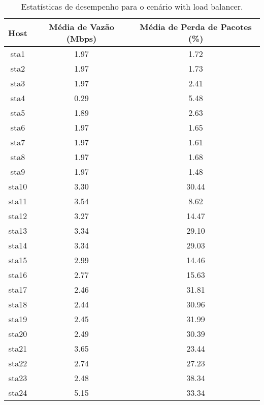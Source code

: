 \begin{table}[htbp]
    \centering
    \label{tab:with_load_balancer_stats}
    \begin{tabular}{|c|c|c|}
        \hline
        \textbf{Host} & \textbf{Média de Vazão (Mbps)} & \textbf{Média de Perda de Pacotes (\%)} \\ \hline
        sta1 & 1.97 & 1.72 \\ \hline
        sta2 & 1.97 & 1.73 \\ \hline
        sta3 & 1.97 & 2.41 \\ \hline
        sta4 & 0.29 & 5.48 \\ \hline
        sta5 & 1.89 & 2.63 \\ \hline
        sta6 & 1.97 & 1.65 \\ \hline
        sta7 & 1.97 & 1.61 \\ \hline
        sta8 & 1.97 & 1.68 \\ \hline
        sta9 & 1.97 & 1.48 \\ \hline
        sta10 & 3.30 & 30.44 \\ \hline
        sta11 & 3.54 & 8.62 \\ \hline
        sta12 & 3.27 & 14.47 \\ \hline
        sta13 & 3.34 & 29.10 \\ \hline
        sta14 & 3.34 & 29.03 \\ \hline
        sta15 & 2.99 & 14.46 \\ \hline
        sta16 & 2.77 & 15.63 \\ \hline
        sta17 & 2.46 & 31.81 \\ \hline
        sta18 & 2.44 & 30.96 \\ \hline
        sta19 & 2.45 & 31.99 \\ \hline
        sta20 & 2.49 & 30.39 \\ \hline
        sta21 & 3.65 & 23.44 \\ \hline
        sta22 & 2.74 & 27.23 \\ \hline
        sta23 & 2.48 & 38.34 \\ \hline
        sta24 & 5.15 & 33.34 \\ \hline
    \end{tabular}
    \caption{Estatísticas de desempenho para o cenário with load balancer.}
\end{table}

